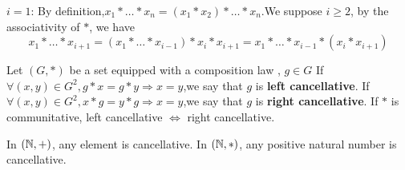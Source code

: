 \documentclass{book}
\numberwithin{equation}{section}
\begin{document}
\begin{proofenv}
    \quad
    \newline
    $i=1$: By definition,$x_1*\dots *x_n=(x_1*x_2)*\dots *x_n$.We suppose $i\geq 2 $, by the associativity of $*$, we have
    $$x_1*\dots *x_{i+1}=(x_1*\dots *x_{i-1})*x_i*x_{i+1}=x_1*\dots *x_{i-1}*(x_i*x_{i+1})$$ 
\end{proofenv}
\begin{definitionenv}
    Let $(G,*)$ be a set equipped with a composition law , $g\in G$
    \newline
    If $\forall (x,y)\in G^2,g*x=g*y\Rightarrow x=y$,we say that $g$ is \textbf{left cancellative}.
    \newline
    If $\forall (x,y)\in G^2,x*g=y*g\Rightarrow x=y$,we say that $g$ is \textbf{right cancellative}.
    \newline
    If $*$ is communitative, left cancellative $\Leftrightarrow$ right cancellative.
\end{definitionenv}
\begin{exampleenv}
    \quad
    \newline
    In $(\mathbb{N},+)$, any element is cancellative.
    \newline
    In $(\mathbb{N},*)$, any positive natural number is cancellative.

\end{exampleenv}
\end{document}
